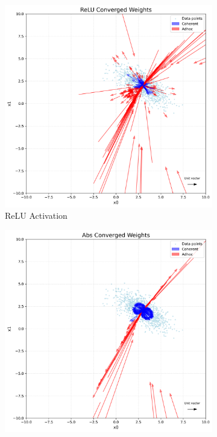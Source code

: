 \begin{figure}[h]
    \centering
    \begin{subfigure}[b]{0.48\textwidth}
        \centering
        \includegraphics[width=\linewidth]{converged_states_relu.png}
        \caption{ReLU Activation}
        \label{fig:converged_relu}
    \end{subfigure}
    \hfill
    \begin{subfigure}[b]{0.48\textwidth}
        \centering
        \includegraphics[width=\linewidth]{converged_states_abs.png}

\end{subfigure}
\end{figure}
